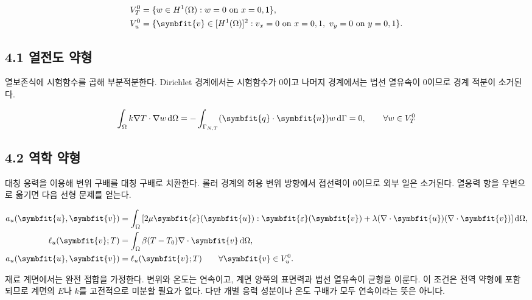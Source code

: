 \documentclass[10pt,a4paper]{article}
\renewcommand{\boldsymbol}[1]{\symbfit{#1}}
\begin{document}
\begin{equation}\begin{aligned}V_T^0&=\{w\in H^1(\Omega):w=0\text{ on }x=0,1\},\\V_u^0&=\{\boldsymbol v\in[H^1(\Omega)]^2:v_x=0\text{ on }x=0,1,\ v_y=0\text{ on }y=0,1\}.\end{aligned}\end{equation}

\subsection{4.1 열전도 약형}

열보존식에 시험함수를 곱해 부분적분한다. Dirichlet 경계에서는 시험함수가 0이고 나머지 경계에서는 법선 열유속이 0이므로 경계 적분이 소거된다.\par

\begin{equation}\int_\Omega k\nabla T\cdot\nabla w\,\mathrm d\Omega=-\int_{\Gamma_{N,T}}(\boldsymbol q\cdot\boldsymbol n)w\,\mathrm d\Gamma=0,\qquad \forall w\in V_T^0\end{equation}

\subsection{4.2 역학 약형}

대칭 응력을 이용해 변위 구배를 대칭 구배로 치환한다. 롤러 경계의 허용 변위 방향에서 접선력이 0이므로 외부 일은 소거된다. 열응력 항을 우변으로 옮기면 다음 선형 문제를 얻는다.\par

\begin{equation}\begin{aligned}a_u(\boldsymbol u,\boldsymbol v)&=\int_\Omega\left[2\mu\boldsymbol\varepsilon(\boldsymbol u):\boldsymbol\varepsilon(\boldsymbol v)+\lambda(\nabla\cdot\boldsymbol u)(\nabla\cdot\boldsymbol v)\right]\mathrm d\Omega,\\\ell_u(\boldsymbol v;T)&=\int_\Omega\beta(T-T_0)\nabla\cdot\boldsymbol v\,\mathrm d\Omega,\\a_u(\boldsymbol u,\boldsymbol v)&=\ell_u(\boldsymbol v;T)\qquad\forall\boldsymbol v\in V_u^0.\end{aligned}\end{equation}

재료 계면에서는 완전 접합을 가정한다. 변위와 온도는 연속이고, 계면 양쪽의 표면력과 법선 열유속이 균형을 이룬다. 이 조건은 전역 약형에 포함되므로 계면의 $E$나 $k$를 고전적으로 미분할 필요가 없다. 다만 개별 응력 성분이나 온도 구배가 모두 연속이라는 뜻은 아니다.\par
\end{document}
